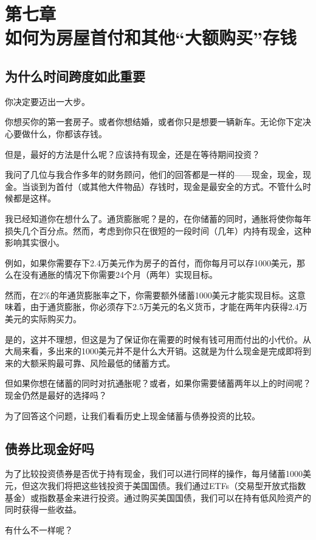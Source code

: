 \section[第七章\q 如何为房屋首付和其他“大额购买”存钱]{第七章\\ 如何为房屋首付和其他“大额购买”存钱}
\renewcommand{\bookchapter}{7}
\setcounter{figure}{0}
\setcounter{table}{0}
\subsection{为什么时间跨度如此重要}
你决定要迈出一大步。

你想买你的第一套房子。或者你想结婚，或者你只是想要一辆新车。无论你下定决心要做什么，你都该存钱。

但是，最好的方法是什么呢？应该持有现金，还是在等待期间投资？

我问了几位与我合作多年的财务顾问，他们的回答都是一样的——现金，现金，现金。当谈到为首付（或其他大件物品）存钱时，现金是最安全的方式。不管什么时候都是这样。

我已经知道你在想什么了。通货膨胀呢？是的，在你储蓄的同时，通胀将使你每年损失几个百分点。然而，考虑到你只在很短的一段时间（几年）内持有现金，这种影响其实很小。

例如，如果你需要存下2.4万美元作为房子的首付，而你每月可以存1000美元，那么在没有通胀的情况下你需要24个月（两年）实现目标。

然而，在2\%的年通货膨胀率之下，你需要额外储蓄1000美元才能实现目标。这意味着，由于通货膨胀，你必须存下2.5万美元的名义货币，才能在两年内获得2.4万美元的实际购买力。

是的，这并不理想，但这是为了保证你在需要的时候有钱可用而付出的小代价。从大局来看，多出来的1000美元并不是什么大开销。这就是为什么现金是完成即将到来的大额采购最可靠、风险最低的储蓄方式。

但如果你想在储蓄的同时对抗通胀呢？或者，如果你需要储蓄两年以上的时间呢？现金仍然是最好的选择吗？

为了回答这个问题，让我们看看历史上现金储蓄与债券投资的比较。

\subsection{债券比现金好吗}
为了比较投资债券是否优于持有现金，我们可以进行同样的操作，每月储蓄1000美元，但这次我们将把这些钱投资于美国国债。我们通过ETFs（交易型开放式指数基金）或指数基金来进行投资。通过购买美国国债，我们可以在持有低风险资产的同时获得一些收益。

有什么不一样呢？

